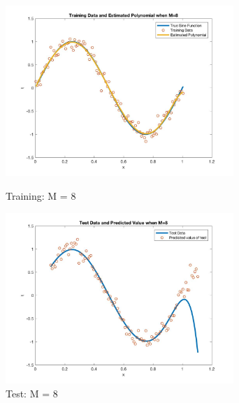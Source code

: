 \documentclass[a4paper]{article}
\begin{document}
\begin{spacing}{2.0}
	\begin{figure}[H]
	    \begin{minipage}[t]{0.5\textwidth}
	        \centering
	        \includegraphics[width=3.4in]{8train.jpeg}
	        \caption{Training: M = 8}
	        \label{fig:side:a}
	    \end{minipage}%
	  \begin{minipage}[t]{0.5\textwidth}
	      \centering
	      \includegraphics[width=3.4in]{8test.jpeg}
	      \caption{Test: M = 8}
	      \label{fig:side:b}
	    \end{minipage}
	\end{figure}	
		

\end{spacing}
\end{document}
